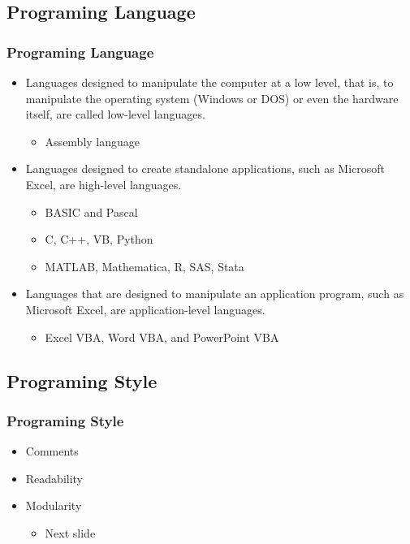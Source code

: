 \documentclass[13pt]{beamer}
\begin{document}
\subsection{Programing Language}
\begin{frame}[t]\frametitle{Programing Language}
    \begin{itemize}
    	\item Languages designed to manipulate the computer at a low level, that is, to manipulate the operating system (Windows or DOS) or even the hardware itself, are called low-level languages. \pause
    	\begin{itemize}
    		\item Assembly language
    	\end{itemize}
      \pause

    	\item Languages designed to create standalone applications, such as Microsoft Excel, are high-level languages. \pause
    	\begin{itemize}
    		\item BASIC and Pascal \pause
    		\item C, C++, VB, Python \pause
    		\item MATLAB, Mathematica, R, SAS, Stata \pause
    	\end{itemize} 
      \pause

    	\item Languages that are designed to manipulate an application program, such as Microsoft Excel, are application-level languages. \pause
    	\begin{itemize}
    	 	\item Excel VBA, Word VBA, and PowerPoint VBA
    	 \end{itemize} 
    \end{itemize}

\end{frame}

\subsection{Programing Style}
\begin{frame}[t]\frametitle{Programing Style}
	\begin{itemize}
		\item Comments
		\item Readability
		\item Modularity
		\begin{itemize}
			\item Next slide
		\end{itemize}
	\end{itemize}

\end{frame}
\end{document}
